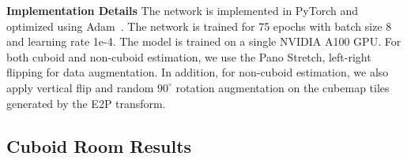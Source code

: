 \documentclass[runningheads]{llncs}
\begin{document}
\noindent\textbf{Implementation Details}\label{sec:implemention_details}
The network is implemented in PyTorch and optimized using Adam~\cite{kingma2014adam}. The network is trained for 75 epochs with batch size 8 and learning rate 1e-4.
The model is trained on a single NVIDIA A100 GPU. 
For both cuboid and non-cuboid estimation, we use the Pano Stretch\cite{sun2019horizonnet}, left-right flipping for data augmentation. In addition, for non-cuboid estimation, we also apply vertical flip and random $90^{\circ}$ rotation augmentation on the cubemap tiles generated by the E2P transform.

\subsection{Cuboid Room Results}\label{sec:cuboid_result}

\begin{table}[t]
\centering
{}
\caption{Quantitative results of cuboid room layout estimation evaluated on the testset of the PanoContext dataset~\cite{zhang2014panocontext} and the Stanford 2D-3D dataset~\cite{armeni2017joint,zou2018layoutnet}. CE means Corner Error, and PE means Pixel Error.}
\label{tab:panocontext}
\end{table}
\end{document}
